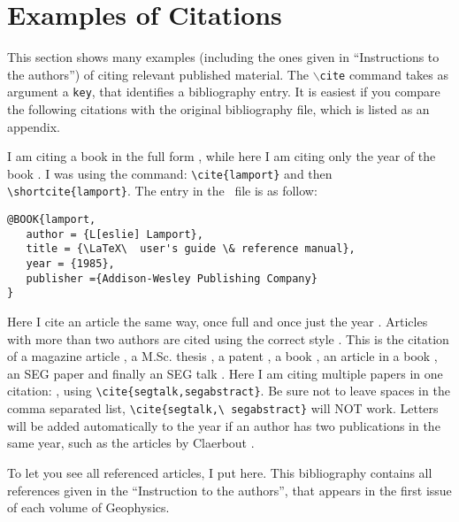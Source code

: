 %

\section{Examples of Citations}

This section shows many examples (including the ones given in 
``Instructions to the authors'') of citing relevant published material.
The {\tt $\backslash$cite} command takes as argument a {\tt key}, 
that identifies a bibliography entry. It is easiest if you compare 
the following citations
with the original bibliography file, which is listed as an appendix.

I am citing a book in the full form \cite{lamport} , 
while here I am citing only the year of the book .
I was using the command: \verb+\cite{lamport}+  and then 
\verb+\shortcite{lamport}+.
The entry in the \BibTeX\ file is as follow:

{\tighten
\begin{verbatim}
@BOOK{lamport,
   author = {L[eslie] Lamport},
   title = {\LaTeX\  user's guide \& reference manual},
   year = {1985},
   publisher ={Addison-Wesley Publishing Company}
}
\end{verbatim}
}

Here I cite an  article the same way, once full \cite{segarticle} and 
once just the year .
Articles with more than two authors are cited using the correct style
\cite{magazine3}.
%
%
This is the citation of a  magazine article \cite{segmagazine},
a M.Sc. thesis \cite{segms},
a patent \cite{patent},
a book \cite{segbook},
an article in a book \cite{inbook},
an  SEG paper \cite{segabstract}
and finally an  SEG talk \cite{segtalk}.
 Here I am citing multiple papers in one citation: 
\cite{segtalk,segabstract}, using 
\verb+\cite{segtalk,segabstract}+. Be sure not to leave spaces in the 
comma separated list, \verb+\cite{segtalk,\ segabstract}+ will NOT work.
Letters will be added automatically to the year if an author has two 
publications in the same year, such as the articles by Claerbout 
.

To let you see all referenced articles, I put 
\verb++ here. This bibliography contains all
references given in the ``Instruction to the authors'', that appears
in the first issue of each volume of Geophysics.

